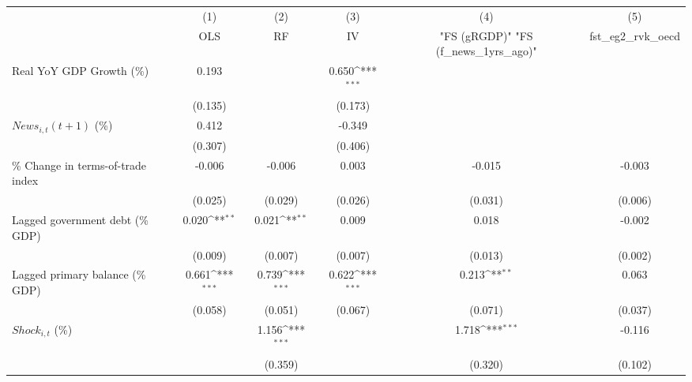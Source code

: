 {
\def\sym#1{\ifmmode^{#1}\else\(^{#1}\)\fi}
\begin{tabular}{l*{5}{c}}
\toprule
                    &\multicolumn{1}{c}{(1)}&\multicolumn{1}{c}{(2)}&\multicolumn{1}{c}{(3)}&\multicolumn{1}{c}{(4)}&\multicolumn{1}{c}{(5)}\\
                    &\multicolumn{1}{c}{OLS}&\multicolumn{1}{c}{RF}&\multicolumn{1}{c}{IV}&\multicolumn{1}{c}{ "FS (gRGDP)"  "FS (f_news_1yrs_ago)" }&\multicolumn{1}{c}{fst_eg2_rvk_oecd}\\
\midrule
Real YoY GDP Growth (\%)&       0.193         &                     &       0.650\sym{***}&                     &                     \\
                    &     (0.135)         &                     &     (0.173)         &                     &                     \\
\addlinespace
$ News_{i,t}(t+1)$ (\%)&       0.412         &                     &      -0.349         &                     &                     \\
                    &     (0.307)         &                     &     (0.406)         &                     &                     \\
\addlinespace
\% Change in terms-of-trade index&      -0.006         &      -0.006         &       0.003         &      -0.015         &      -0.003         \\
                    &     (0.025)         &     (0.029)         &     (0.026)         &     (0.031)         &     (0.006)         \\
\addlinespace
Lagged government debt (\% GDP)&       0.020\sym{**} &       0.021\sym{**} &       0.009         &       0.018         &      -0.002         \\
                    &     (0.009)         &     (0.007)         &     (0.007)         &     (0.013)         &     (0.002)         \\
\addlinespace
Lagged primary balance (\% GDP)&       0.661\sym{***}&       0.739\sym{***}&       0.622\sym{***}&       0.213\sym{**} &       0.063         \\
                    &     (0.058)         &     (0.051)         &     (0.067)         &     (0.071)         &     (0.037)         \\
\addlinespace
$ Shock_{i,t}$ (\%) &                     &       1.156\sym{***}&                     &       1.718\sym{***}&      -0.116         \\
                    &                     &     (0.359)         &                     &     (0.320)         &     (0.102)         \\

\end{tabular}}
